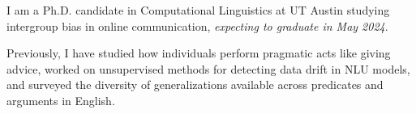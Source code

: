 I am a Ph.D. candidate in Computational Linguistics at UT Austin studying intergroup bias in online communication, \emph{expecting to graduate in May 2024}. 

Previously, I have studied how individuals perform pragmatic acts like giving advice, worked on unsupervised methods for detecting data drift in NLU models, and surveyed the diversity of generalizations available across predicates and arguments in English.
